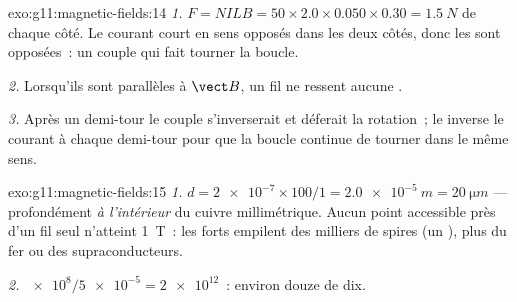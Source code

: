\begin{solution}{exo:g11:magnetic-fields:14}
\emph{1.} $F = NILB = 50 \times 2.0 \times 0.050 \times 0.30 =
\qty{1.5}{N}$ de chaque côté. Le courant court en sens opposés dans les
deux côtés, donc les  sont opposées~:
un couple qui fait tourner la boucle.

\emph{2.} Lorsqu'ils sont parallèles à $\vect B$, un fil ne ressent
aucune .

\emph{3.} Après un demi-tour le couple s'inverserait et déferait la
rotation~; le  inverse le courant à
chaque demi-tour pour que la boucle continue de tourner dans le même
sens.
\end{solution}

\begin{solution}{exo:g11:magnetic-fields:15}
\emph{1.} $d = \num{2e-7} \times 100 / 1 = \qty{2.0e-5}{m} =
\qty{20}{\micro m}$ --- profondément \emph{à l'intérieur} du cuivre
millimétrique. Aucun point accessible près d'un fil seul n'atteint
\qty{1}{T}~: les forts
 empilent des milliers de
spires (un ), plus du fer ou des
supraconducteurs.

\emph{2.} $\num{e8} / \num{5e-5} = \num{2e12}$~: environ douze
 de dix.
\end{solution}

